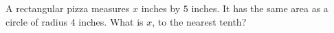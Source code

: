 A rectangular pizza measures $x$ inches by $5$ inches. It has the same area as a circle of radius $4$ inches. What is $x$, to the nearest tenth?
